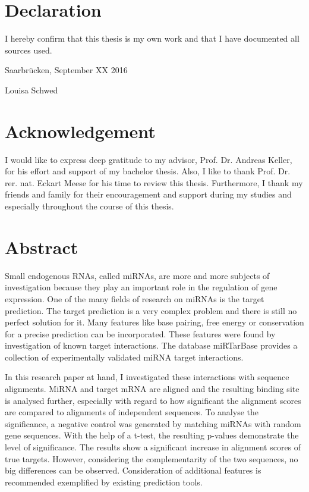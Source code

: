 \documentclass[11pt,  a4paper]{report}
\begin{document}
\section*{Declaration}
I hereby confirm that this thesis is my own work and that I have documented all sources used. 

\vspace{1cm}

\noindent Saarbr\"ucken, September XX 2016
\vspace{1.5cm}

\noindent Louisa Schwed
\newpage

\newpage

\section*{Acknowledgement}
I would like to express deep gratitude to my advisor, Prof. Dr. Andreas Keller, for his effort and support of my bachelor thesis. Also, I like to thank Prof. Dr. rer. nat. Eckart Meese for his time  to review this thesis. Furthermore, I thank my friends and family for their encouragement and support during my studies and especially throughout the course of this thesis. 

\newpage


\section*{Abstract}

Small endogenous RNAs, called miRNAs, are more and more subjects of investigation because they play an important role in the regulation of gene expression. One of the many fields of research on miRNAs is the target prediction. The target prediction is a very complex problem and there is still no perfect solution for it. Many features like base pairing, free energy or conservation for a precise prediction can be incorporated. These features were found by investigation of known target interactions. The database miRTarBase provides a collection of experimentally validated miRNA target interactions. 

In this research paper at hand, I investigated these interactions with sequence alignments. MiRNA and target mRNA are aligned and the resulting binding site is analysed further, especially with regard to how significant the alignment scores are compared to alignments of independent sequences. To analyse the significance, a negative control was generated by matching miRNAs with random gene sequences. With the help of a t-test, the resulting p-values demonstrate the level of significance. The results show a significant increase in alignment scores of true targets. However, considering the complementarity of the two sequences, no big differences can be observed. Consideration of additional features is recommended exemplified by existing prediction tools.
 
\end{document}
